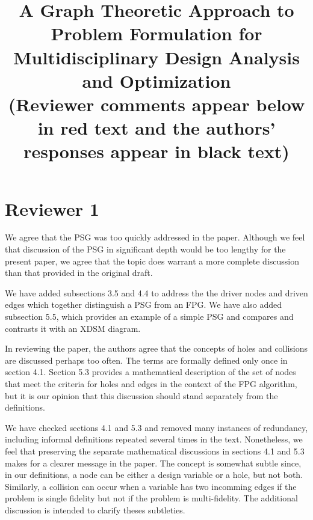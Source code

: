 \documentclass{aiaa-tc}
\title{A Graph Theoretic Approach to Problem Formulation for 
Multidisciplinary Design Analysis and Optimization \\  (Reviewer comments appear below in red text and the authors' responses appear in black text)}
\begin{document}
\maketitle

\section{Reviewer 1}


We agree that the PSG was too quickly addressed in the paper. Although we feel that 
discussion of the PSG in significant depth would be too lengthy for the present paper, we agree that the topic does warrant a more complete discussion than that provided in the 
original draft. 

We have added subsections 3.5 and 4.4  to address the the driver nodes and driven edges which 
together distinguish a PSG from an FPG.  We have also added subsection 5.5,
which provides an example of a simple PSG and compares and contrasts it with an XDSM diagram. 


In reviewing the paper, the authors agree that the concepts of holes and collisions are discussed perhaps too often.  The terms are formally defined only once 
in section 4.1. Section 5.3 provides a mathematical description of the set of nodes that meet
the criteria for holes and edges  in the context of the FPG algorithm, but it is our opinion that this discussion should stand separately from the definitions. 

We have checked sections 4.1 and 5.3 and removed many instances of redundancy, including informal definitions repeated several times in the text.  Nonetheless, we feel that preserving the separate mathematical discussions in sections 4.1 and 5.3 makes for a clearer message in the paper. The concept is somewhat subtle 
since, in our definitions, a node can be either a design variable or a hole, but not both. Similarly, 
a collision can occur when a variable has two incomming edges if the problem is single fidelity but not if the problem 
is multi-fidelity. The additional discussion is intended to clarify theses subtleties. 
\end{document}
